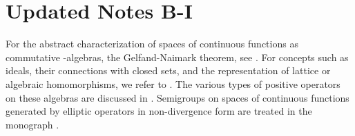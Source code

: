 \section{Updated Notes B-I}
For the abstract characterization of spaces of continuous functions as commutative \CA-algebras, \ie the Gelfand-Naimark theorem, see . 
For concepts such as ideals, their connections with closed sets, and the representation of lattice or algebraic homomorphisms, we refer to . 
The various types of positive operators on these algebras are discussed in . 
Semigroups on spaces of continuous functions generated by elliptic
operators in non-divergence form are treated in the monograph
.

